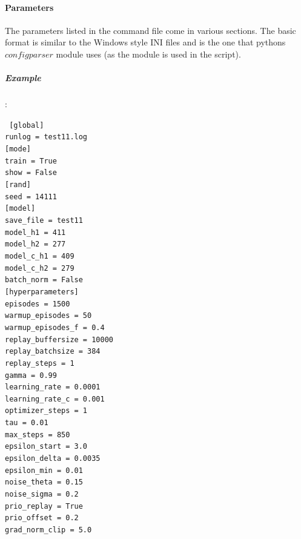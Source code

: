 \documentclass[a4paper]{article}
\begin{document}
\paragraph{Parameters}
The parameters listed in the command file come in various sections. The basic format
is similar to the Windows style INI files and is the one that pythons $configparser$
module uses (as the module is used in the script).

\subparagraph{Example}
:\\
\tiny

\texttt{
{[global]} \\
runlog = test11.log \\
{[mode]} \\
train = True \\
show = False \\
{[rand]} \\
seed = 14111 \\
{[model]} \\
save\_file  = test11 \\
model\_h1   = 411 \\
model\_h2   = 277 \\
model\_c\_h1 = 409 \\
model\_c\_h2 = 279 \\
batch\_norm = False \\
{[hyperparameters]} \\
episodes          = 1500 \\
warmup\_episodes   = 50 \\
warmup\_episodes\_f = 0.4 \\
replay\_buffersize = 10000 \\
replay\_batchsize  = 384 \\
replay\_steps      = 1 \\
gamma             = 0.99 \\
learning\_rate     = 0.0001 \\
learning\_rate\_c   = 0.001 \\
optimizer\_steps   = 1 \\
tau               = 0.01 \\
max\_steps         = 850 \\
epsilon\_start     = 3.0 \\
epsilon\_delta     = 0.0035 \\
epsilon\_min       = 0.01 \\
noise\_theta       = 0.15 \\
noise\_sigma       = 0.2 \\
prio\_replay       = True \\
prio\_offset       = 0.2 \\
grad\_norm\_clip    = 5.0
}
\end{document}
